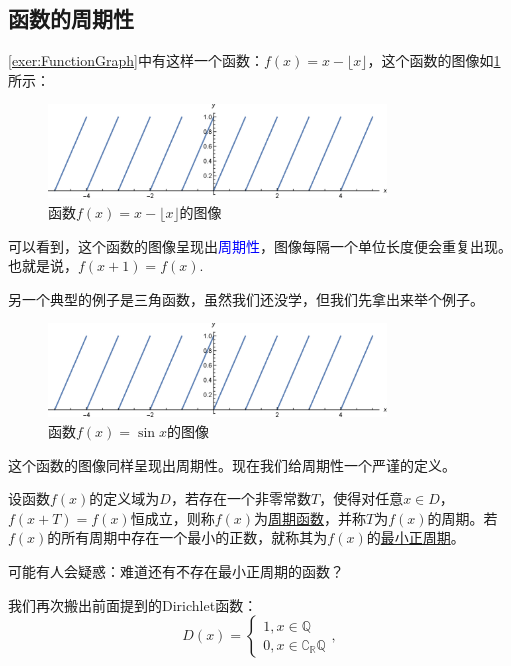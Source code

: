 \documentclass[lang=cn,math=cm,chinesefont=nofont,11pt,scheme=chinese,onecol]{elegantbook}
\begin{document}
\subsection{函数的周期性}

\ref{exer:FunctionGraph}中有这样一个函数：$f(x)=x-\lfloor x\rfloor$，这个函数的图像如\ref{2.2.4function1}所示：

\begin{figure}[h]
  \centering
  \includegraphics[width=0.8\textwidth]{image/2.2.4function1.eps}
  \caption{函数$f(x)=x-\lfloor x\rfloor$的图像}
  \label{2.2.4function1}
\end{figure}

可以看到，这个函数的图像呈现出\textcolor{blue}{周期性}，图像每隔一个单位长度便会重复出现。也就是说，$f(x+1)=f(x)$.

另一个典型的例子是三角函数，虽然我们还没学，但我们先拿出来举个例子。

\begin{figure}[h]
  \centering
  \includegraphics[width=0.8\textwidth]{image/2.2.4function1.eps}
  \caption{函数$f(x)=\sin x$的图像}
  \label{2.2.4function2}
\end{figure}

这个函数的图像同样呈现出周期性。现在我们给周期性一个严谨的定义。

\begin{definition}
  设函数$f(x)$的定义域为$D$，若存在一个非零常数$T$，使得对任意$x\in D$，$f(x+T)=f(x)$恒成立，则称$f(x)$为\underline{周期函数}，并称$T$为$f(x)$的周期。若$f(x)$的所有周期中存在一个最小的正数，就称其为$f(x)$的\underline{最小正周期}。
\end{definition}

可能有人会疑惑：难道还有不存在最小正周期的函数？

我们再次搬出前面提到的Dirichlet函数： 
$$D(x)=
\begin{cases}
  1,x\in\mathbb{Q}
  \\0,x\in\complement_{\mathbb{R}}\mathbb{Q}
\end{cases},$$
\end{document}
